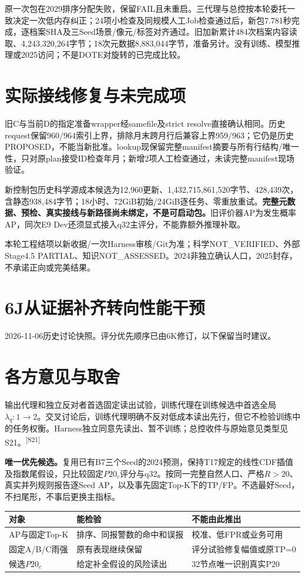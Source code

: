 \documentclass[UTF8,10.5pt,a4paper,fontset=none]{ctexart}
\newcommand{\evi}[1]{\textsuperscript{\color{muted}[#1]}}
\newcommand{\pageheading}[2]{\clearpage\section*{#1}\textcolor{muted}{#2}\par\vspace{3pt}}
\begin{document}
原一次包在2029排序分配失败，保留FAIL且未重启。三代理与总控按本轮委托一致决定一次低内存纠正；24项小检查及同规模人工Job检查通过后，新包7.781秒完成，逐档案SHA及三Seed场景/像元/标签对齐通过。旧加新累计484次档案内容读取、4,243,320,264字节；18次元数据8,883,044字节，准备另计。没有训练、模型推理或2025访问；不是DOTE对旋转的已完成比较。

\section*{实际接线修复与未完成项}
旧C与当前D的指定准备wrapper经samefile及strict resolve直接确认相同。历史request保留960/964索引上界，排除月末跨月行后兼容上界959/963；它仍是历史PROPOSED，不能当新批准。lookup现保留完整manifest摘要与所有行结构/唯一性，只对原plan接受ID检查年月；新增2项人工检查通过，未读完整manifest现场验证。

新控制包历史科学源成本候选为12,960更新、1,432,715,861,520字节、428,439次，含静态938,484字节；18小时、72GiB初始/24GiB逐任务、零重放重试。\textbf{完整元数据、预检、真实接线与新路径尚未绑定，不是可启动包。}旧评价器AP为发生概率AP，同次E9 Dev还须显式接入q32主评分，不能靠额外推理补取。

本轮工程结项以新收据/一次Harness审核/Git为准；科学NOT\_VERIFIED、外部Stage4.5 PARTIAL、知识NOT\_ASSESSED。2024非独立确认人口，2025封存，不承诺正向或完美结果。

\pageheading{6J\quad 从证据补齐转向性能干预}{2026-11-06历史讨论快照。评分优先顺序已由6K修订，以下保留当时建议。}
\section*{各方意见与取舍}
输出代理和独立反对者首选固定读出试验，训练代理在训练候选中首选全局$\lambda_q:1\to2$。交叉讨论后，训练代理明确不反对低成本读出先行，但它不检验训练中的任务权衡。Harness独立同意先读出、暂不训练；总控收件与原始意见类型见S21。\evi{S21}

\textbf{唯一优先候选。}复用已有B7三个Seed的2024预测，保持T17规定的线性CDF插值及指数尾假设，只比较固定$P20_c$评分与q32。按同一完整自然人口、严格$R>20$、真实并列规则报告逐Seed AP，以及事先固定Top-K下的TP/FP。不选最好Seed，不扫尾形，不事后更换主指标。

\begin{tabularx}{\textwidth}{@{}p{2.7cm}X X@{}}
\toprule 对象 & 能检验 & 不能由此推出\\\midrule
AP与固定Top-K & 排序、同报警数的命中和误报 & 校准、低FPR或业务可用\\
固定A/B/C雨强 & 原有表现继续保留 & 评分试验修复幅值或原TP=0\\
候选$P20_c$ & 给定补全假设的风险读出 & 32节点唯一识别真实P20\\
\bottomrule
\end{tabularx}
\end{document}
